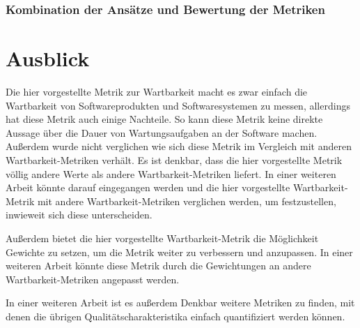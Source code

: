 \documentclass[12pt, a4paper, ngerman]{article}
\begin{document}
\subsubsection{Kombination der Ansätze und Bewertung der Metriken}


\section{Ausblick}

Die hier vorgestellte Metrik zur Wartbarkeit macht es zwar einfach
die Wartbarkeit von Softwareprodukten und Softwaresystemen
zu messen, allerdings hat diese Metrik auch einige Nachteile.
So kann diese Metrik keine direkte Aussage über die Dauer 
von Wartungsaufgaben an der Software machen.
Außerdem wurde nicht verglichen wie sich diese Metrik 
im Vergleich mit anderen Wartbarkeit-Metriken verhält.
Es ist denkbar, dass die hier vorgestellte Metrik
völlig andere Werte als andere Wartbarkeit-Metriken liefert.
In einer weiteren Arbeit könnte darauf eingegangen werden
und die hier vorgestellte Wartbarkeit-Metrik
mit andere Wartbarkeit-Metriken verglichen werden,
um festzustellen, inwieweit sich diese unterscheiden.

Außerdem bietet die hier vorgestellte Wartbarkeit-Metrik 
die Möglichkeit Gewichte zu setzen, 
um die Metrik weiter zu verbessern und anzupassen.
In einer weiteren Arbeit könnte diese Metrik durch
die Gewichtungen an andere Wartbarkeit-Metriken angepasst werden.

In einer weiteren Arbeit ist es außerdem Denkbar weitere Metriken zu finden,
mit denen die übrigen Qualitätscharakteristika 
einfach quantifiziert werden können.



\newpage
\printbibliography
\end{document}
